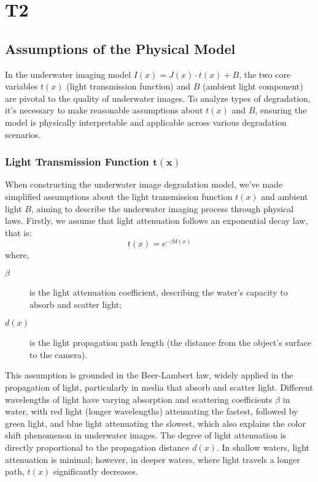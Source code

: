 \documentclass[11pt]{article}
\begin{document}
    \section{T2}

    \subsection{Assumptions of the Physical Model}
    In the underwater imaging model \( I(x) = J(x) \cdot t(x) + B \),
    the two core variables \( t(x) \) (light transmission function) and \( B \) (ambient light component) are pivotal to the quality of underwater images.
    To analyze types of degradation, it's necessary to make reasonable assumptions about \( t(x) \) and \( B \), ensuring the model is physically interpretable and applicable across various degradation scenarios.

    \subsubsection{Light Transmission Function \( \boldsymbol{t(x)} \)}
    When constructing the underwater image degradation model, we've made simplified assumptions about the light transmission function \( t(x) \) and ambient light \( B \), aiming to describe the underwater imaging process through physical laws.
    Firstly, we assume that light attenuation follows an exponential decay law, that is:
    \[ t(x) = e^{-\beta d(x)} \]
    where,
    \begin{description}
        \item [$\beta$] is the light attenuation coefficient, describing the water's capacity to absorb and scatter light;
        \item [$d(x)$] is the light propagation path length (the distance from the object's surface to the camera).
    \end{description}
    This assumption is grounded in the Beer-Lambert law, widely applied in the propagation of light, particularly in media that absorb and scatter light.
    Different wavelengths of light have varying absorption and scattering coefficients \( \beta \) in water, with red light (longer wavelengths) attenuating the fastest, followed by green light, and blue light attenuating the slowest,
    which also explains the color shift phenomenon in underwater images.
    The degree of light attenuation is directly proportional to the propagation distance \( d(x) \). In shallow waters, light attenuation is minimal; however, in deeper waters, where light travels a longer path, \( t(x) \) significantly decreases.
\end{document}
